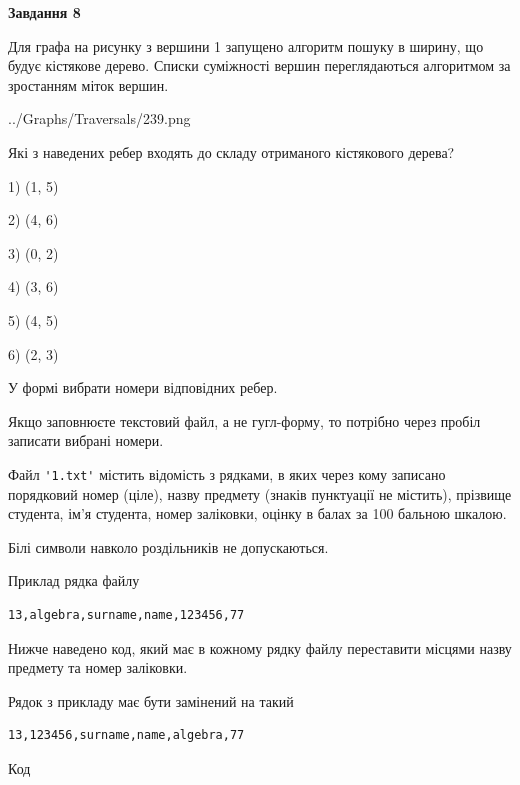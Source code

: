 \documentclass[12pt, ukrainian]{article}
\def\code#1{\Verb!#1!}
\begin{document}
{\begin {large}
{\begin {center}\textbf{Завдання 8}\end {center}}\par
Для графа на рисунку з вершини 1 запущено алгоритм пошуку в ширину, що будує кістякове дерево. Списки суміжності вершин переглядаються алгоритмом за зростанням міток вершин.\par
\begin{center}
	{../Graphs/Traversals/239.png}
\end{center}
\par Які з наведених ребер входять до складу отриманого кістякового дерева?\par
1) (1, 5)\par
2) (4, 6)\par
3) (0, 2)\par
4) (3, 6)\par
5) (4, 5)\par
6) (2, 3)\par
{\vskip 15pt} У формі вибрати номери відповідних ребер.


Якщо заповнюєте текстовий файл, а не гугл-форму, то потрібно через пробіл записа\-ти вибрані номери.\par
\newpage


Файл \code{'1.txt'} містить відомість з рядками, в яких через кому записано поряд\-ковий номер (ціле), назву предмету (знаків пунктуації не містить), прізвище студента, ім'я студента, номер заліковки, оцінку в балах за 100 бальною шкалою.

Білі символи навколо роздільників не допускаються.

Приклад рядка файлу



\begin{verbatim}
13,algebra,surname,name,123456,77
\end{verbatim}


Нижче наведено код, який має в кожному рядку файлу переставити місцями назву предмету та номер заліковки.

Рядок з прикладу має бути замінений на такий



\begin{verbatim}
13,123456,surname,name,algebra,77
\end{verbatim}




Код




\end{large}}
\end{document}
